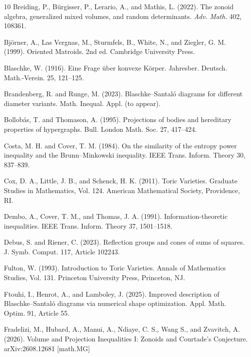\documentclass[11pt]{amsart}
\theoremstyle{definition}
\theoremstyle{remark}
\begin{document}
\begin{thebibliography}{10}
 Breiding, P., Bürgisser, P., Lerario, A., and Mathis, L. (2022). The zonoid algebra, generalized mixed volumes, and random determinants. \emph{Adv. Math.} 402, 108361.


 Björner, A., Las Vergnas, M., Sturmfels, B., White, N., and Ziegler, G. M. (1999). Oriented Matroids. 2nd ed. Cambridge University Press.

 Blaschke, W. (1916). Eine Frage \"uber konvexe K\"orper. Jahresber. Deutsch. Math.-Verein. 25, 121–125.

 Brandenberg, R. and Runge, M. (2023). Blaschke–Santaló diagrams for different diameter variants. Math. Inequal. Appl. (to appear).

 Bollobás, T. and Thomason, A. (1995). Projections of bodies and hereditary properties of hypergraphs. Bull. London Math. Soc. 27, 417–424.

 Costa, M. H. and Cover, T. M. (1984). On the similarity of the entropy power inequality and the Brunn–Minkowski inequality. IEEE Trans. Inform. Theory 30, 837–839.

 Cox, D. A., Little, J. B., and Schenck, H. K. (2011). Toric Varieties. Graduate Studies in Mathematics, Vol. 124. American Mathematical Society, Providence, RI.

 Dembo, A., Cover, T. M., and Thomas, J. A. (1991). Information-theoretic inequalities. IEEE Trans. Inform. Theory 37, 1501–1518.

 Debus, S. and Riener, C. (2023). Reflection groups and cones of sums of squares. J. Symb. Comput. 117, Article 102243.


 Fulton, W. (1993). Introduction to Toric Varieties. Annals of Mathematics Studies, Vol. 131. Princeton University Press, Princeton, NJ.


 Ftouhi, I., Henrot, A., and Lamboley, J. (2025). Improved description of Blaschke–Santaló diagrams via numerical shape optimization. Appl. Math. Optim. 91, Article 55.

 Fradelizi, M., Hubard, A., Manui, A., Ndiaye, C. S., Wang S., and Zvavitch, A. (2026). Volume and Projection Inequalities I: Zonoids and Courtade's Conjecture. 	arXiv:2608.12681 [math.MG]


\end{thebibliography}
\end{document}

